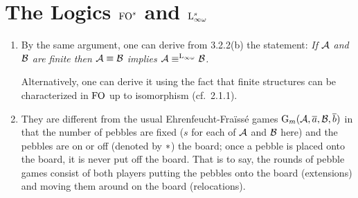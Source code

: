 \section{The Logics $\folog[s]$ and $\inflog[s]$}
\begin{enumerate}[1.]
%
\item {} By the same argument, one can derive from 3.2.2(b) the statement: \emph{If $\mathcal{A}$ and $\mathcal{B}$ are finite then $\mathcal{A} \equiv \mathcal{B}$ implies $\strct{A} \equv^{\inflog} \strct{B}$.}

Alternatively, one can derive it using the fact that finite structures can be characterized in $\folog$ up to isomorphism (cf.~2.1.1).
%
\item {} They are different from the usual Ehrenfeucht-Fra\"iss\'e games $\game{m}(\strct{A}, \vect{a}, \strct{B}, \vect{b})$ in that the number of pebbles are fixed ($s$ for each of $\mathcal{A}$ and $\mathcal{B}$ here) and the pebbles are on or off (denoted by $\ast$) the board; once a pebble is placed onto the board, it is never put off the board. That is to say, the rounds of pebble games consist of both players putting the pebbles onto the board (extensions) and moving them around on the board (relocations).


\end{enumerate}
